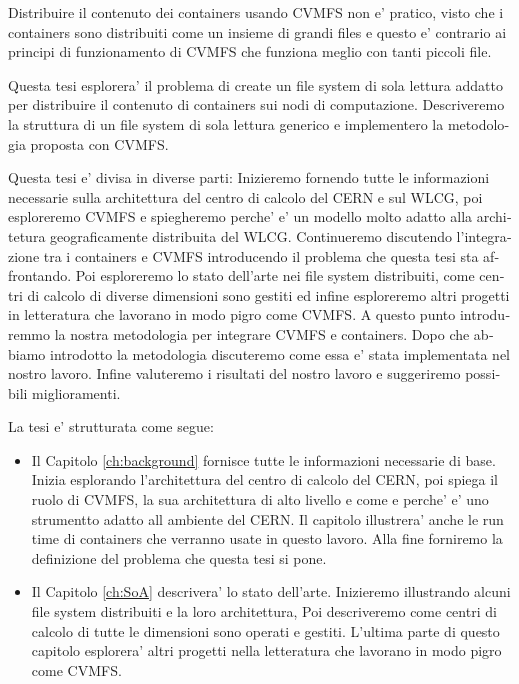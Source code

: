 \begin{otherlanguage}{italian}
Distribuire il contenuto dei containers usando CVMFS non e' pratico, visto che
        i containers sono distribuiti come un insieme di grandi files e questo
        e' contrario ai principi di funzionamento di CVMFS che funziona meglio
        con tanti piccoli file.

Questa tesi esplorera' il problema di create un file system di sola lettura
        addatto per distribuire il contenuto di containers sui nodi di
        computazione. Descriveremo la struttura di un file system di sola
        lettura generico e implementero la metodologia proposta con CVMFS.

Questa tesi e' divisa in diverse parti: Inizieremo fornendo tutte le
        informazioni necessarie sulla architettura del centro di calcolo del
        CERN e sul WLCG, poi esploreremo CVMFS e spiegheremo perche' e' un
        modello molto adatto alla architetura geograficamente distribuita del
        WLCG. Continueremo discutendo l'integrazione tra i containers e CVMFS
        introducendo il problema che questa tesi sta affrontando. Poi
        esploreremo lo stato dell'arte nei file system distribuiti, come centri
        di calcolo di diverse dimensioni sono gestiti ed infine esploreremo
        altri progetti in letteratura che lavorano in modo pigro come CVMFS. A
        questo punto introduremmo la nostra metodologia per integrare CVMFS e
        containers. Dopo che abbiamo introdotto la metodologia discuteremo come
        essa e' stata implementata nel nostro lavoro. Infine valuteremo i
        risultati del nostro lavoro e suggeriremo possibili miglioramenti.

La tesi e' strutturata come segue: 

\begin{itemize} 
        
        \item Il Capitolo \ref{ch:background} fornisce tutte le informazioni
                necessarie di base. Inizia esplorando l'architettura del centro
                di calcolo del CERN, poi spiega il ruolo di CVMFS, la sua
                architettura di alto livello e come e perche' e' uno strumentto
                adatto all ambiente del CERN.  Il capitolo illustrera' anche le
                run time di containers che verranno usate in questo lavoro.
                Alla fine forniremo la definizione del problema che questa tesi
                si pone.  
        
        \item Il Capitolo \ref{ch:SoA} descrivera' lo stato dell'arte.
                Inizieremo illustrando alcuni file system distribuiti e la loro
                architettura, Poi descriveremo come centri di calcolo di tutte
                le dimensioni sono operati e gestiti. L'ultima parte di questo
                capitolo esplorera' altri progetti nella letteratura che
                lavorano in modo pigro come CVMFS.


\end{itemize}
\end{otherlanguage}
